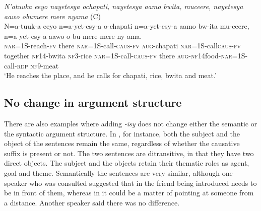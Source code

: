 \documentclass[output=paper,colorlinks,citecolor=brown,draftmode]{langscibook}
\begin{document}
\ea \label{ex:Saebo:call} \emph{N'atuuka eeyo nayetesya ochapati, nayetesya aamo bwita, muceere, nayetesya aawo obumere mere nyama} (C) \\
  \gll N=a-tuuk-a eeyo n=a-yet-esy-a o-chapati n=a-yet-esy-a aamo bw-ita mu-ceere, n=a-yet-esy-a aawo o-bu-mere-mere ny-ama. \\ 
\textsc{nar}=1S-reach-\textsc{fv} there \textsc{nar=}1S-call-\textsc{caus-fv} \textsc{aug}-chapati \textsc{nar=}1S-call\textsc{caus-fv} together \textsc{nf14}-bwita \textsc{nf3}-rice \textsc{nar=}1S-call-\textsc{caus-fv} there \textsc{aug-nf14}food-\textsc{nar=}1S-call-\textsc{rdp} \textsc{nf9}-meat\\
    \glt  `He reaches the place, and he calls for chapati, rice, bwita and meat.' 
      \z

\subsection{No change in argument structure} \label{sec:Saebo:no-change}

There are also examples where adding \emph{-isy} does not  change either the semantic or the syntactic argument structure. In , for instance, both the subject and the object of the sentences remain the same, regardless of whether the causative suffix is present or not. The two sentences are ditransitive, in that they have two direct objects. The subject and the objects retain their thematic roles as agent, goal and theme. Semantically the sentences are very similar, although one speaker who was consulted suggested that in   the friend being introduced needs to be in front of them, whereas in  it could be a matter of pointing at someone from a distance. Another speaker said there was no difference.  
\end{document}
